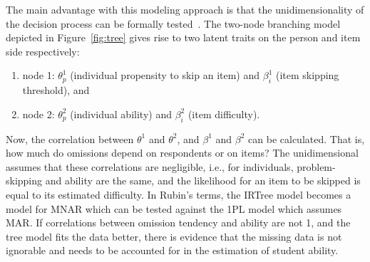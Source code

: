 \documentclass[anonymous,manuscript,review]{acmart}
\begin{document}
The main advantage with this modeling approach is that the unidimensionality of the decision process can be formally tested~\cite{de2012irtrees}. The two-node branching model depicted in Figure~\ref{fig:tree} gives rise to two latent traits on the person and item side respectively: 
\begin{enumerate}
    \item node 1: $\theta_p^1$ (individual propensity to skip an item) and $\beta_i^1$ (item skipping threshold), and 
    \item node 2: $\theta_p^2$ (individual ability) and $\beta_i^2$ (item difficulty).
\end{enumerate}
Now, the correlation between $\theta^1$ and $\theta^2$, and $\beta^1$ and $\beta^2$ can be calculated. That is, how much do omissions depend on respondents or on items? The unidimensional assumes that these correlations are negligible, i.e., for individuals, problem-skipping and ability are the same, and the likelihood for an item to be skipped is equal to its estimated difficulty. In Rubin's \cite{rubin1976inference} terms, the IRTree model becomes a model for MNAR which can be tested against the 1PL model which assumes MAR. If correlations between omission tendency and ability are not 1, and the tree model fits the data better, there is evidence that the missing data is not ignorable and needs to be accounted for in the estimation of student ability. 
\end{document}

